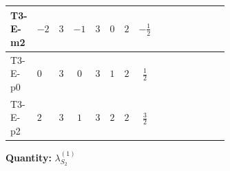 \documentclass[8pt]{article}
\begin{document}
\begin{landscape}
\begin{longtable}{@{}llcccccc >{\raggedright\arraybackslash}p{0.21\linewidth} >{\raggedright\arraybackslash}p{0.21\linewidth} >{\raggedright\arraybackslash}p{0.21\linewidth}@{}}
T3-E-m2 & $-2$ & $3$ & $-1$ & $3$ & $0$ & $2$ & $-\frac{1}{2}$ & \scriptsize\adjustbox{max width=\linewidth}{$\begin{gathered} {\lambda_{S_2}^{(1)}} (4 T_{\nu}^{(2)}+14 {\lambda_{S_2}^{(A)}})\end{gathered}$} & \scriptsize\adjustbox{max width=\linewidth}{$\begin{gathered} +2 {\lambda_{S_2}^{(A)}} T_{\nu}^{(2)}\end{gathered}$} & \scriptsize\adjustbox{max width=\linewidth}{$\begin{gathered} -3 \operatorname{Tr}\!\left({y_2}\,\left({y_2}\right)^{\dagger}\,{y_2}\,\left({y_2}\right)^{\dagger}\right)\end{gathered}$} \\
\midrule
T3-E-p0 & $0$ & $3$ & $0$ & $3$ & $1$ & $2$ & $\frac{1}{2}$ & \scriptsize\adjustbox{max width=\linewidth}{$\begin{gathered} {\lambda_{S_2}^{(1)}} (4 T_{\nu}^{(2)}+14 {\lambda_{S_2}^{(A)}})\end{gathered}$} & \scriptsize\adjustbox{max width=\linewidth}{$\begin{gathered} +2 {\lambda_{S_2}^{(A)}} T_{\nu}^{(2)}\end{gathered}$} & \scriptsize\adjustbox{max width=\linewidth}{$\begin{gathered} -3 \operatorname{Tr}\!\left({y_2}\,\left({y_2}\right)^{\dagger}\,{y_2}\,\left({y_2}\right)^{\dagger}\right)\end{gathered}$} \\
\midrule
T3-E-p2 & $2$ & $3$ & $1$ & $3$ & $2$ & $2$ & $\frac{3}{2}$ & \scriptsize\adjustbox{max width=\linewidth}{$\begin{gathered} {\lambda_{S_2}^{(1)}} (4 T_{\nu}^{(2)}+14 {\lambda_{S_2}^{(A)}})\end{gathered}$} & \scriptsize\adjustbox{max width=\linewidth}{$\begin{gathered} +2 {\lambda_{S_2}^{(A)}} T_{\nu}^{(2)}\end{gathered}$} & \scriptsize\adjustbox{max width=\linewidth}{$\begin{gathered} -3 \operatorname{Tr}\!\left({y_2}\,\left({y_2}\right)^{\dagger}\,{y_2}\,\left({y_2}\right)^{\dagger}\right)\end{gathered}$} \\
\midrule
\bottomrule
\end{longtable}
\clearpage
\noindent\textbf{Quantity: }$\lambda_{S_2}^{(1)}$\par\smallskip

\end{landscape}
\end{document}
